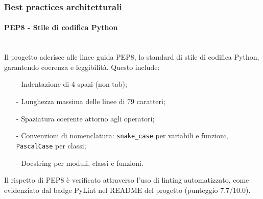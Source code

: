 \documentclass[10pt]{article}
\newcommand{\myparagraph}[1]{\paragraph{#1}\mbox{}\\}
\begin{document}

    \subsubsection{Best practices architetturali}
    \myparagraph{PEP8 - Stile di codifica Python}
    Il progetto aderisce alle linee guida PEP8, lo standard di stile di codifica Python, garantendo coerenza e leggibilità. Questo include:
    \begin{itemize}
        \item[-] Indentazione di 4 spazi (non tab);
        \item[-] Lunghezza massima delle linee di 79 caratteri;
        \item[-] Spaziatura coerente attorno agli operatori;
        \item[-] Convenzioni di nomenclatura: \texttt{snake\_case} per variabili e funzioni, \texttt{PascalCase} per classi;
        \item[-] Docstring per moduli, classi e funzioni.
    \end{itemize}
    Il rispetto di PEP8 è verificato attraverso l'uso di linting automatizzato, come evidenziato dal badge PyLint nel README del progetto (punteggio 7.7/10.0).
\end{document}
